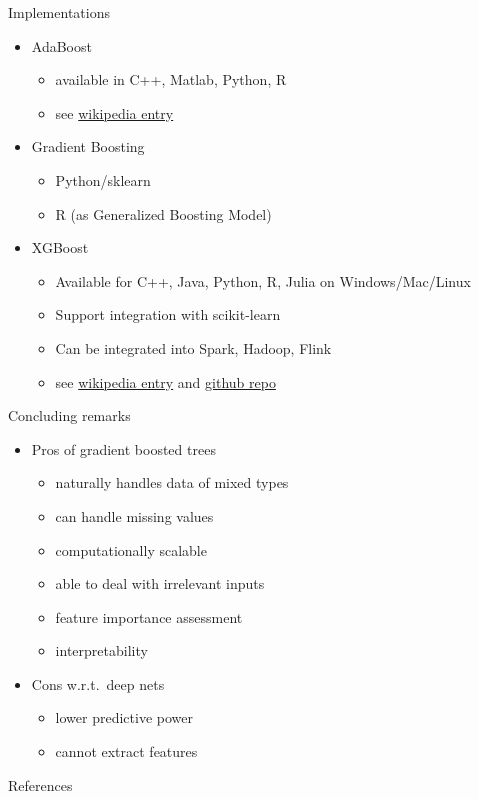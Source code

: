 \documentclass[handout]{beamer}
\begin{document}
\begin{frame}{Implementations}
	\begin{itemize}
		\item AdaBoost
		\begin{itemize}
			\item available in C++, Matlab, Python, R
			\item see \href{https://en.wikipedia.org/wiki/AdaBoost\#Implementations}{wikipedia entry}
		\end{itemize}
		
		\item Gradient Boosting
		\begin{itemize}
			\item Python/sklearn
			\item R (as Generalized Boosting Model)
		\end{itemize}
		
		\item XGBoost 
		\begin{itemize}
			\item Available for C++, Java, Python, R, Julia on Windows/Mac/Linux
			\item Support integration with scikit-learn
			\item Can be integrated into Spark, Hadoop, Flink
			\item see \href{https://en.wikipedia.org/wiki/Xgboost}{wikipedia entry} and \href{https://github.com/dmlc/xgboost}{github repo}
		\end{itemize}
	\end{itemize}
\end{frame}

\begin{frame}{Concluding remarks}
	\begin{itemize}[<+>]
		\item Pros of gradient boosted trees
		\begin{itemize}[<.->]
			\item naturally handles data of mixed types
			\item can handle missing values
			\item computationally scalable 
			\item able to deal with irrelevant inputs
			\item feature importance assessment
			\item interpretability
		\end{itemize}
	
		\item Cons w.r.t.\ deep nets
		\begin{itemize}[<.->]
			\item lower predictive power
			\item cannot extract features
		\end{itemize}
	\end{itemize}

\end{frame}

\begin{frame}[allowframebreaks]{References}
	
	
\end{frame}
\end{document}
